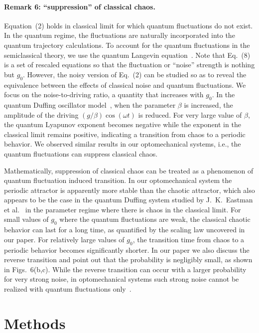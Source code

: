 \documentclass[12pt]{wlscirep}
\begin{document}
\paragraph*{Remark 6: ``suppression'' of classical chaos.}
Equation~(2) holds in classical limit for which quantum fluctuations 
do not exist. In the quantum regime, the
fluctuations are naturally incorporated into the quantum trajectory
calculations. To account for the quantum fluctuations in the semiclassical
theory, we use the quantum Langevin equation~\cite{LKM:2008}. 
Note that Eq.~(8) is a set of rescaled equations so that the
fluctuation or ``noise'' strength is nothing but $g_0$. However,
the noisy version of Eq.~(2) can be studied so as to reveal the equivalence
between the effects of classical noise and quantum fluctuations.
We focus on the noise-to-driving ratio, a quantity that
increases with $g_0$. In the quantum Duffing oscillator model~\cite{EHC:2016}, 
when the parameter $\beta$ is increased, the amplitude
of the driving $(g/\beta)\cos{(\omega t)}$ is reduced. For very large
value of $\beta$, the quantum Lyapunov exponent becomes negative while
the exponent in the classical limit remains positive, indicating a
transition from chaos to a periodic behavior. We observed similar results
in our optomechanical systems, i.e., the quantum fluctuations can suppress
classical chaos.

Mathematically, suppression of classical chaos can be treated as a phenomenon
of quantum fluctuation induced transition. 
In our optomechanical system the periodic attractor is apparently more
stable than the chaotic attractor, which also appears to be the case in
the quantum Duffing system studied by J.~K.~Eastman et al.~\cite{EHC:2016} in
the parameter regime where there is chaos in the classical limit. For
small values of $g_0$ where the quantum fluctuations are weak, the classical
chaotic behavior can last for a long time, as quantified by the scaling
law uncovered in our paper. For relatively large values of $g_0$, the
transition time from chaos to a periodic behavior becomes significantly
shorter. In our paper we also discuss the reverse transition and point
out that the probability is negligibly small, as shown in Figs.~6(b,c).
While the reverse transition can occur with a larger probability for very
strong noise, in optomechanical systems such strong noise cannot be
realized with quantum fluctuations only~\cite{VGFBTGVZA:2007,ME:2009,QCHM:2012}.

\section*{Methods} 
\end{document}
